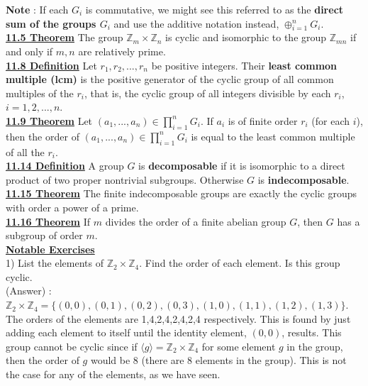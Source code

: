 \documentclass[12pt, letterpaper]{article}
\begin{document}
{\bf Note} : If each $G_i$ is commutative, we might see this referred to as the {\bf direct sum of the groups $G_i$} and use the additive notation instead, $\oplus_{i=1}^{n} G_i$.\\

\noindent \underline{\bf 11.5 Theorem} The group $\mathbb{Z}_m \times \mathbb{Z}_n$ is cyclic and isomorphic to the group $\mathbb{Z}_{mn}$ if and only if $m,n$ are relatively prime. \\

\noindent \underline{\bf  11.8 Definition} Let $r_1,r_2,...,r_n$ be positive integers. Their {\bf least common multiple (lcm)} is the positive generator of the cyclic group of all common multiples of the $r_i$, that is, the cyclic group of all integers divisible by each $r_i$, $i = 1,2,...,n$. \\

\noindent \underline{\bf 11.9 Theorem} Let $(a_1,...,a_n) \in \prod_{i=1}^{n} G_i$. If $a_i$ is of finite order $r_i$ (for each $i$), then the order of $(a_1,...,a_n) \in \prod_{i=1}^{n} G_i$ is equal to the least common multiple of all the $r_i$. \\

\noindent \underline{\bf 11.14 Definition} A group $G$ is {\bf decomposable} if it is isomorphic to a direct product of two proper nontrivial subgroups. Otherwise $G$ is {\bf indecomposable}. \\

\noindent \underline{\bf 11.15 Theorem} The finite indecomposable groups are exactly the cyclic groups with order a power of a prime. \\

\noindent \underline{\bf 11.16 Theorem} If $m$ divides the order of a finite abelian group $G$, then $G$ has a subgroup of order $m$. \\

\noindent \underline{\bf Notable Exercises} \\

1) List the elements of $\mathbb{Z}_2 \times \mathbb{Z}_4$. Find the order of each element. Is this group cyclic. \\

(Answer) : $\mathbb{Z}_2 \times \mathbb{Z}_4 = \{(0,0),(0,1),(0,2),(0,3),(1,0),(1,1),(1,2),(1,3)\}$. The orders of the elements are 1,4,2,4,2,4,2,4 respectively. This is found by just adding each element to itself until the identity element, $(0,0)$, results. This group cannot be cyclic since if $\langle g \rangle = \mathbb{Z}_2 \times \mathbb{Z}_4$ for some element $g$ in the group, then the order of $g$ would be 8 (there are 8 elements in the group). This is not the case for any of the elements, as we have seen.\\
\end{document}
